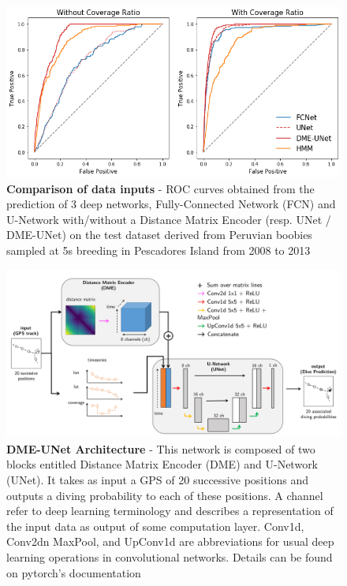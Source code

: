 \documentclass{article}
\begin{document}
\begin{figure}[h]
  \centering
  \includegraphics[scale=0.5]{figure2.png}
  \caption{\textbf{Comparison of data inputs} - ROC curves obtained from the prediction of 3 deep networks, Fully-Connected Network (FCN) and U-Network with/without a Distance Matrix Encoder (resp. UNet / DME-UNet) on the test dataset derived from Peruvian boobies sampled at 5s breeding in Pescadores Island from 2008 to 2013}
  \label{figure2}
\end{figure}

\begin{figure}[h]
  \hspace*{-2cm}
  \includegraphics[scale=0.45]{figure3.png}
  \caption{\textbf{DME-UNet Architecture} - This network is composed of two blocks entitled Distance Matrix Encoder (DME) and U-Network (UNet). It takes as input a GPS of 20 successive positions and outputs a diving probability to each of these positions. A channel refer to deep learning terminology and describes a representation of the input data as output of some computation layer. Conv1d, Conv2dn MaxPool, and UpConv1d are abbreviations for usual deep learning operations in convolutional networks. Details can be found on pytorch's documentation \cite{paskze_pytorch_2019} }
  \label{figure3}
\end{figure}
\end{document}
